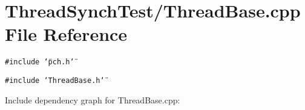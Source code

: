 \section{Thread\-Synch\-Test/Thread\-Base.cpp File Reference}
\label{_thread_base_8cpp}
{\tt \#include \char`\"{}pch.h\char`\"{}}\par
{\tt \#include \char`\"{}Thread\-Base.h\char`\"{}}\par


Include dependency graph for Thread\-Base.cpp: